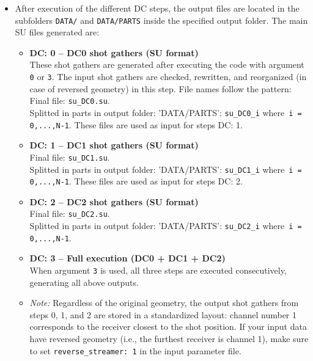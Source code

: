 \documentclass[11pt, oneside]{article}   	%
\begin{document}
\begin{itemize}

\item After execution of the different DC steps, the output files are located in the subfolders \texttt{DATA/} and \texttt{DATA/PARTS} inside the specified output folder. The main SU files generated are:

\begin{itemize}
    \item \textbf{DC: 0 – DC0 shot gathers (SU format)}\\
    These shot gathers are generated after executing the code with argument \texttt{0} or \texttt{3}. The input shot gathers are checked, rewritten, and reorganized (in case of reversed geometry) in this step. File names follow the pattern:\\
    Final file: \texttt{su\_DC0.su}.\\
    Splitted in parts in output folder: 'DATA/PARTS':
    \texttt{su\_DC0\_i} where~\texttt{i = 0,...,N-1}. These files are used as input for steps DC: 1.

    \item \textbf{DC: 1 – DC1 shot gathers (SU format)}\\
   Final file: \texttt{su\_DC1.su}.\\
    Splitted in parts in output folder: 'DATA/PARTS':
    \texttt{su\_DC1\_i} where~\texttt{i = 0,...,N-1}. These files are used as input for steps DC: 2.

    \item \textbf{DC: 2 – DC2 shot gathers (SU format)}\\
    Final file: \texttt{su\_DC2.su}.\\
    Splitted in parts in output folder: 'DATA/PARTS':
    \texttt{su\_DC2\_i} where~\texttt{i = 0,...,N-1}.

    \item \textbf{DC: 3 – Full execution (DC0 + DC1 + DC2)}\\
    When argument \texttt{3} is used, all three steps are executed consecutively, generating all above outputs.
    
    \item \textit{Note:} Regardless of the original geometry, the output shot gathers from steps 0, 1, and 2 are stored in a standardized layout: channel number 1 corresponds to the receiver closest to the shot position. If your input data have reversed geometry (i.e., the furthest receiver is channel 1), make sure to set \texttt{reverse\_streamer: 1} in the input parameter file.
\end{itemize}


\end{itemize}
\end{document}
